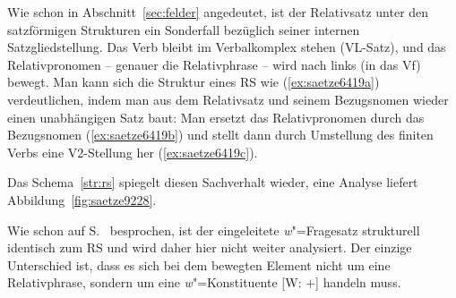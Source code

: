 Wie schon in Abschnitt~\ref{sec:felder} angedeutet, ist der Relativsatz unter den satzförmigen Strukturen ein Sonderfall bezüglich seiner internen Satzgliedstellung.
Das Verb bleibt im Verbalkomplex stehen (VL-Satz), und das Relativpronomen -- genauer die Relativphrase -- wird nach links (in das Vf) bewegt.
Man kann sich die Struktur eines RS wie (\ref{ex:saetze6419a}) verdeutlichen, indem man aus dem Relativsatz und seinem Bezugsnomen wieder einen unabhängigen Satz baut:
Man ersetzt das Relativpronomen durch das Bezugsnomen (\ref{ex:saetze6419b}) und stellt dann durch Umstellung des finiten Verbs eine V2-Stellung her (\ref{ex:saetze6419c}).

\begin{exe}
  \ex\label{ex:saetze6419}
  \begin{xlist}
  \end{xlist}
\end{exe}

Das Schema~\ref{str:rs} spiegelt diesen Sachverhalt wieder, eine Analyse liefert Abbildung~\ref{fig:saetze9228}.



Wie schon auf S.~\pageref{abs:923478} besprochen, ist der eingeleitete \textit{w}"=Fragesatz strukturell identisch zum RS und wird daher hier nicht weiter analysiert.
Der einzige Unterschied ist, dass es sich bei dem bewegten Element nicht um eine Relativphrase, sondern um eine \textit{w}"=Konstituente [\textsc{W}: $+$] handeln muss.




